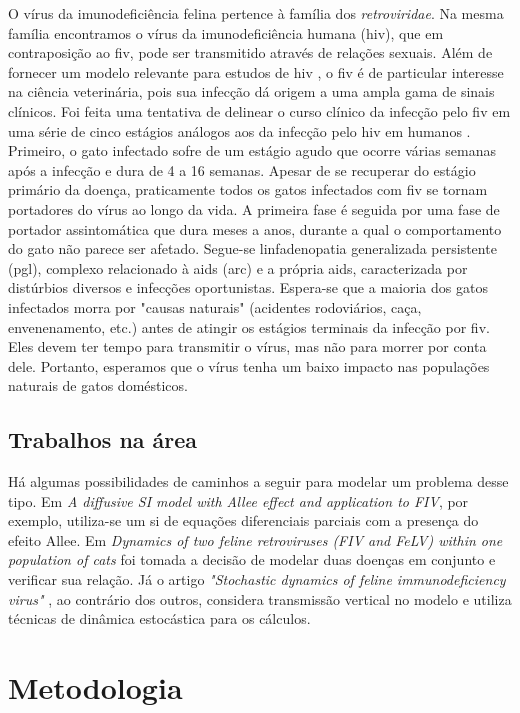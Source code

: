 \documentclass{article}
\begin{document}
\noindent O vírus da imunodeficiência felina pertence à família dos \textit{retroviridae}. Na mesma família encontramos o vírus da imunodeficiência humana (\gls{hiv}), que em contraposição ao \gls{fiv}, pode ser transmitido através de relações sexuais.
Além de fornecer um modelo relevante para estudos de \gls{hiv}   , o \gls{fiv} é de particular interesse na ciência veterinária, pois sua infecção dá origem a uma ampla gama de sinais clínicos.
Foi feita uma tentativa de delinear o curso clínico da infecção pelo \gls{fiv} em uma série de cinco estágios análogos aos da infecção pelo \gls{hiv} em humanos
\cite{base}. Primeiro, o gato infectado sofre de um estágio agudo que ocorre várias semanas após a infecção e dura de 4 a 16 semanas. Apesar de se recuperar do estágio primário da doença, praticamente todos os gatos infectados com \gls{fiv} se tornam portadores do vírus ao longo da vida. A primeira fase é seguida por uma fase de portador assintomática que dura meses a anos, durante a qual o comportamento do gato não parece ser afetado. Segue-se linfadenopatia generalizada persistente (\gls{pgl}), complexo relacionado à \gls{aids} (\gls{arc}) e a própria \gls{aids}, caracterizada por distúrbios diversos e infecções oportunistas. Espera-se que a maioria dos gatos infectados morra por "causas naturais" (acidentes rodoviários, caça, envenenamento, etc.) antes de atingir os estágios terminais da infecção por \gls{fiv}. Eles devem ter tempo para transmitir o vírus, mas não para morrer por conta dele. Portanto, esperamos que o vírus tenha um baixo impacto nas populações naturais de gatos domésticos.

\subsection{Trabalhos na área}
Há algumas possibilidades de caminhos a seguir para modelar um problema desse tipo. Em \textit{A diffusive SI model with Allee effect and application to FIV}\cite{difusao}, por exemplo, utiliza-se um \gls{si} de equações diferenciais parciais com a presença do efeito Allee. Em \textit{Dynamics of two feline retroviruses (FIV and FeLV)
within one population of cats} \cite{franck} foi tomada a decisão de modelar duas doenças em conjunto e verificar sua relação. Já o artigo \textit{"Stochastic dynamics of feline immunodeficiency virus"} \cite{estocastico}, ao contrário dos outros, considera transmissão vertical no modelo e utiliza técnicas de dinâmica estocástica para os cálculos.

\section{Metodologia}
\end{document}
